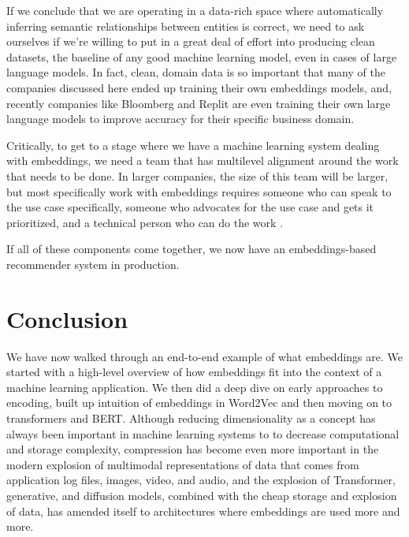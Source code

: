 \documentclass[11pt, table]{diazessay} %
\begin{document}
\begin{sloppypar}
If we conclude that we are operating in a data-rich space where automatically inferring semantic relationships between entities is correct, we need to ask ourselves if we're willing to put in a great deal of effort into producing clean datasets, the baseline of any good machine learning model, even in cases of large language models. In fact, clean, domain data is so important that many of the companies discussed here ended up training their own embeddings models, and, recently companies like Bloomberg \citep{wu2023bloomberggpt} and Replit \citep{Shabani_2023} are even training their own large language models to improve accuracy for their specific business domain.

Critically, to get to a stage where we have a machine learning system dealing with embeddings, we need a team that has multilevel alignment around the work that needs to be done. In larger companies, the size of this team will be larger, but most specifically work with embeddings requires someone who can speak to the use case specifically, someone who advocates for the use case and gets it prioritized, and a technical person who can do the work \citep{meil2023ai}.

If all of these components come together, we now have an embeddings-based recommender system in production.


\section{Conclusion}

We have now walked through an end-to-end example of what embeddings are. We started with a high-level overview of how embeddings fit into the context of a machine learning application. We then did a deep dive on early approaches to encoding, built up intuition of embeddings in Word2Vec and then moving on to transformers and BERT. Although reducing dimensionality as a concept has always been important in machine learning systems to to decrease computational and storage complexity, compression has become even more important in the modern explosion of multimodal representations of data that comes from application log files, images, video, and audio, and the explosion of Transformer, generative, and diffusion models, combined with the cheap storage and explosion of data, has amended itself to architectures where embeddings are used more and more.


\end{sloppypar}
\end{document}
